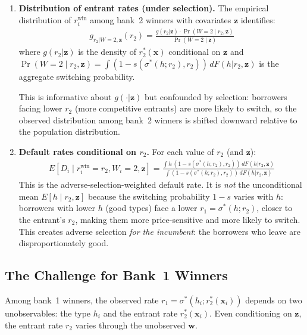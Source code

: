 \documentclass[12pt]{article}
\theoremstyle{plain}
\theoremstyle{plain}
\theoremstyle{definition}  %
\theoremstyle{remark}  %
\begin{document}
\begin{enumerate}
    \item \textbf{Distribution of entrant rates (under selection).} The empirical distribution of $r_i^{\text{win}}$ among bank~2 winners with covariates $\mathbf{z}$ identifies:
    \begin{align}\label{eq:g2}
        g_{r_2|W=2,\mathbf{z}}(r_2) = \frac{g(r_2|\mathbf{z}) \cdot \Pr(W=2 \mid r_2, \mathbf{z})}{\Pr(W=2 \mid \mathbf{z})}
    \end{align}
    where $g(r_2|\mathbf{z})$ is the density of $r_2^*(\mathbf{x})$ conditional on $\mathbf{z}$ and $\Pr(W=2 \mid r_2, \mathbf{z}) = \int (1-s(\sigma^*(h;r_2), r_2)) \, dF(h|r_2, \mathbf{z})$ is the aggregate switching probability.
    
    This is informative about $g(\cdot|\mathbf{z})$ but confounded by selection: borrowers facing lower $r_2$ (more competitive entrants) are more likely to switch, so the observed distribution among bank~2 winners is shifted downward relative to the population distribution.
    
    \item \textbf{Default rates conditional on $r_2$.} For each value of $r_2$ (and $\mathbf{z}$):
    \begin{align}\label{eq:d2}
        E[D_i \mid r_i^{\text{win}} = r_2, W_i = 2, \mathbf{z}] = \frac{\int h\,(1-s(\sigma^*(h;r_2),r_2))\, dF(h|r_2, \mathbf{z})}{\int (1-s(\sigma^*(h;r_2),r_2))\, dF(h|r_2, \mathbf{z})}
    \end{align}
    This is the adverse-selection-weighted default rate. It is \emph{not} the unconditional mean $E[h \mid r_2, \mathbf{z}]$ because the switching probability $1-s$ varies with $h$: borrowers with lower $h$ (good types) face a lower $r_1 = \sigma^*(h; r_2)$, closer to the entrant's $r_2$, making them more price-sensitive and more likely to switch. This creates adverse selection \emph{for the incumbent}: the borrowers who leave are disproportionately good.
\end{enumerate}

\subsection{The Challenge for Bank~1 Winners}\label{sec:challenge}

Among bank~1 winners, the observed rate $r_1 = \sigma^*(h_i; r_2^*(\mathbf{x}_i))$ depends on two unobservables: the type $h_i$ and the entrant rate $r_2^*(\mathbf{x}_i)$. Even conditioning on $\mathbf{z}$, the entrant rate $r_2$ varies through the unobserved $\mathbf{w}$.
\end{document}
